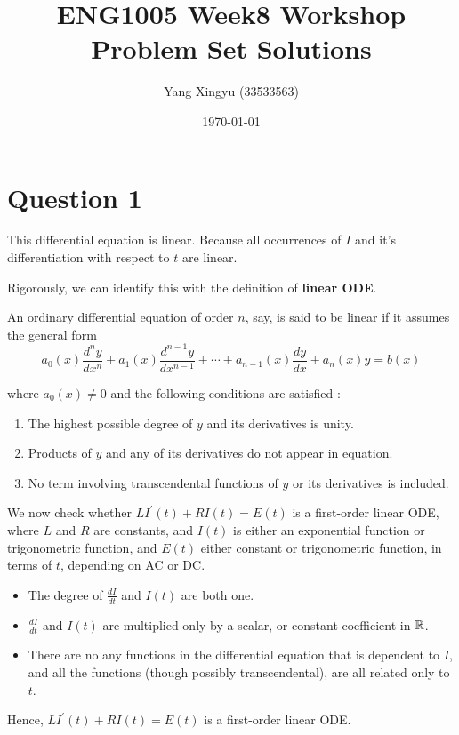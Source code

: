 \documentclass[12pt,a4paper]{article}
\begin{document}
\newcommand{\df}[2]{
    \frac{d#1}{d#2}
}

\title{ENG1005 Week8 Workshop Problem Set Solutions}
\author{Yang Xingyu (33533563)}
\date{\today}
\maketitle

\section*{Question 1}
\begin{solution}
    This differential equation is linear. Because all occurrences of $I$ and it's differentiation with respect to $t$ are linear.
\end{solution}

\begin{remark}
    Rigorously, we can identify this with the definition of \textbf{linear ODE}.
    \begin{definition}
    An ordinary differential equation of order $n$, say, is said to be linear if it assumes the general form
$$
a_0(x) \frac{d^n y}{d x^n}+a_1(x) \frac{d^{n-1} y}{d x^{n-1}}+\cdots+a_{n-1}(x) \frac{d y}{d x}+a_n(x) y=b(x)
$$

where $a_0(x) \neq 0$ and the following conditions are satisfied :
\begin{enumerate}
    \item The highest possible degree of $y$ and its derivatives is unity.
    \item Products of $y$ and any of its derivatives do not appear in equation.
    \item No term involving transcendental functions of $y$ or its derivatives is included.
\end{enumerate}
\end{definition}

We now check whether $L I^{\prime}(t)+R I(t)=E(t)$ is a first-order linear ODE, where $L$ and $R$ are constants, and $I(t)$ is either an exponential function or trigonometric function, and $E(t)$ either constant or trigonometric function, in terms of $t$, depending on AC or DC.
\begin{itemize}
    \item The degree of $\df{I}{t}$ and $I(t)$ are both one.
    \item $\df{I}{t}$ and $I(t)$ are multiplied only by a scalar, or constant coefficient in $\mathbb{R}$.
    \item There are no any functions in the differential equation that is dependent to $I$, and all the functions (though possibly transcendental), are all related only to $t$.
\end{itemize}
Hence, $L I^{\prime}(t)+R I(t)=E(t)$ is a first-order linear ODE.
\end{remark}
\end{document}
